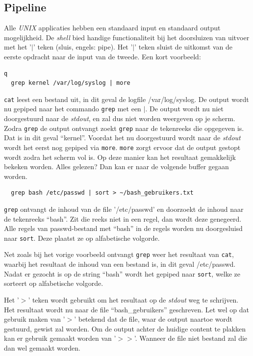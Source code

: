 \subsection{Pipeline}
Alle \emph{UNIX} applicaties hebben een standaard input en standaard output mogelijkheid. De \emph{shell} bied handige functionaliteit bij het doorsluizen van uitvoer met het '$|$' teken (sluis, engels: pipe). Het '$|$' teken sluist de uitkomst van de eerste opdracht naar de input van de tweede. Een kort voorbeeld:
\begin{lstlisting}q
  grep kernel /var/log/syslog | more
\end{lstlisting}
\index{\textpipe}
\texttt{cat} leest een bestand uit, in dit geval de logfile /var/log/syslog. De output wordt nu gepiped naar het commando \texttt{grep} met een $|$. De output wordt nu niet doorgestuurd naar de \emph{stdout}, en zal dus niet worden weergeven op je scherm. Zodra \texttt{grep} de output ontvangt zoekt \texttt{grep} naar de tekenreeks die opgegeven is. Dat is in dit geval ``kernel''. Voordat het nu doorgestuurd wordt naar de \emph{stdout} wordt het eerst nog gepiped via \texttt{more}. \texttt{more} zorgt ervoor dat de output gestopt wordt zodra het scherm vol is. Op deze manier kan het resultaat gemakkelijk bekeken worden. Alles gelezen? Dan kan er naar de volgende buffer gegaan worden. 

\begin{lstlisting}
  grep bash /etc/passwd | sort > ~/bash_gebruikers.txt
\end{lstlisting}\index{$>$}
\texttt{grep} ontvangt de inhoud van de file '/etc/passwd' en doorzoekt de inhoud naar de tekenreeks ``bash''. Zit die reeks niet in een regel, dan wordt deze genegeerd. Alle regels van passwd-bestand met ``bash'' in de regels worden nu doorgesluisd naar \texttt{sort}. Deze plaatst ze op alfabetische volgorde. 

Net zoals bij het vorige voorbeeld ontvangt \texttt{grep} weer het resultaat van \texttt{cat}, waarbij het resultaat de inhoud van een bestand is, in dit geval /etc/passwd. Nadat er gezocht is op de string ``bash'' wordt het gepiped naar \texttt{sort}, welke ze sorteert op alfabetische volgorde. 

Het '$>$' teken wordt gebruikt om het resultaat op de \emph{stdout} weg te schrijven. Het resultaat wordt nu naar de file ``bash\_gebruikers'' geschreven. Let wel op dat gebruik maken van '$>$' betekend dat de file, waar de output naartoe wordt gestuurd, gewist zal worden. Om de output achter de huidige content te plakken kan er gebruik gemaakt worden van '$>>$'\index{$>>$}. Wanneer de file niet bestand zal die dan wel gemaakt worden.

